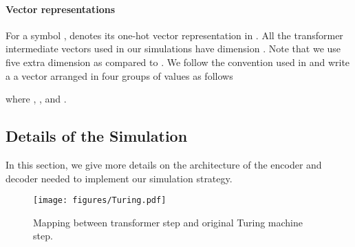 \documentclass{article}
\begin{document}
\paragraph{Vector representations}
For a symbol ,  denotes its one-hot vector representation in .
All the transformer intermediate vectors used in our simulations have dimension .
Note that we use five extra dimension as compared to \citet{Perez19}.
We follow the convention used in \citet{Perez19} and write a a vector  arranged in four groups of values
as follows

where , , and .

\subsection{Details of the Simulation}
\label{sec:details}

In this section, we give more details on the architecture of the encoder and decoder needed to implement our simulation strategy. 


\begin{figure}[b]
    \vspace{-5mm}
    \centering
    \texttt{[image: figures/Turing.pdf]}
    \vspace{-10mm}
    \caption{Mapping between transformer step and original Turing machine step.}
    \label{fig:apndx_turing}
\end{figure}
\end{document}
